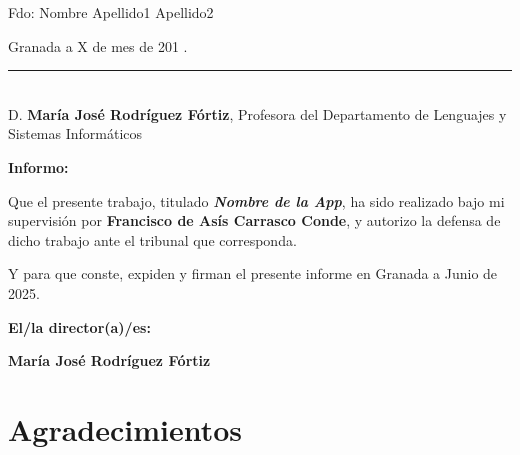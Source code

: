 \noindent Fdo: Nombre Apellido1 Apellido2

\vspace{2cm}

\begin{flushright}
Granada a X de mes de 201 .
\end{flushright}


\cleardoublepage

\thispagestyle{empty}

\noindent\rule[-1ex]{\textwidth}{2pt}\\[4.5ex]

D. \textbf{María José Rodríguez Fórtiz}, Profesora del Departamento de Lenguajes y Sistemas Informáticos

\vspace{0.5cm}

\textbf{Informo:}

\vspace{0.5cm}

Que el presente trabajo, titulado \textit{\textbf{Nombre de la App}},
ha sido realizado bajo mi supervisión por \textbf{Francisco de Asís Carrasco Conde}, y autorizo la defensa de dicho trabajo ante el tribunal
que corresponda.

\vspace{0.5cm}

Y para que conste, expiden y firman el presente informe en Granada a Junio de 2025.

\vspace{1cm}

\textbf{El/la director(a)/es: }

\vspace{5cm}

\noindent \textbf{María José Rodríguez Fórtiz}

\chapter*{Agradecimientos}




